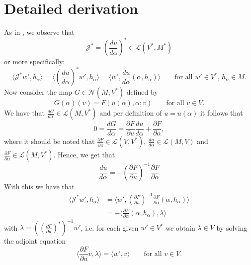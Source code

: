 \documentclass[11pt]{article}
\begin{document}
\section{Detailed derivation}
As in \cite{bouziani2023physics}, we observe that
\begin{equation}
    \mathcal{J}^* = \left(\frac{du}{d\alpha}\right)^* \in \mathcal{L}(V^*,M^*)
\end{equation}
or more specifically:
\begin{equation}
    \langle\mathcal{J}^*w',h_\alpha \rangle  = \langle \left(\frac{du}{d\alpha}\right)^* w',h_\alpha \rangle = \langle w',\frac{du}{d\alpha}(\alpha,h_\alpha) \rangle \qquad\text{for all $w'\in V^*$, $h_\alpha\in M$}.
\end{equation}
Now consider the map $G\in\mathcal{N}(M,V^*)$ defined by
\begin{equation}
    G(\alpha)(v) = F(u(\alpha),\alpha;v) \qquad\text{for all $v\in V$.}
\end{equation} 
We have that $\frac{dG}{d\alpha}\in \mathcal{L}(M,V^*)$ and per definition of $u=u(\alpha)$ it follows that
\begin{equation}
     0 = \frac{dG}{d\alpha} = \frac{\partial F}{\partial u}\frac{du}{d\alpha} + \frac{\partial F}{\partial \alpha},
\end{equation}
where it should be noted that $\frac{\partial F}{\partial u}\in \mathcal{L}(V,V^*)$, $\frac{du}{d\alpha}\in \mathcal{L}(M,V)$ and $\frac{\partial F}{\partial \alpha}\in \mathcal{L}(M,V^*)$. Hence, we get that
\begin{equation}
    \frac{du}{d\alpha} = - \left(\frac{\partial F}{\partial u}\right)^{-1}\frac{\partial F}{\partial\alpha}
\end{equation}
With this we have that 
\begin{equation}
    \begin{aligned}
    \langle\mathcal{J}^*w',h_\alpha \rangle &= \langle w',\left(\frac{\partial F}{\partial u}\right)^{-1}\frac{\partial F}{\partial\alpha}(\alpha,h_\alpha)\rangle\\
    &= -\langle \frac{\partial F}{\partial\alpha}(\alpha,h_\alpha), \lambda\rangle
    \end{aligned}
\end{equation}
with $\lambda = \left(\left(\frac{\partial F}{\partial u}\right)^*\right)^{-1}w'$, i.e. for each given $w'\in V^*$ we obtain $\lambda\in V$ by solving the adjoint equation
\begin{equation}
\langle \frac{\partial F}{\partial u}v,\lambda\rangle = \langle w',v\rangle \qquad\text{for all $v\in V$}.
\end{equation}
\end{document}
